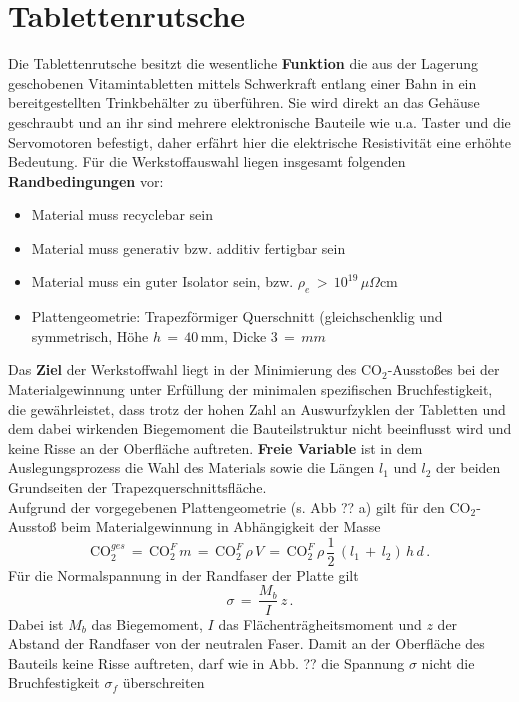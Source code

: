 \section{Tablettenrutsche}
Die Tablettenrutsche besitzt die wesentliche \textbf{Funktion} die aus der Lagerung geschobenen Vitamintabletten mittels Schwerkraft entlang einer Bahn in ein bereitgestellten Trinkbehälter zu überführen. Sie wird direkt an das Gehäuse geschraubt und an ihr sind mehrere elektronische Bauteile wie u.a. Taster und die Servomotoren befestigt, daher erfährt hier die elektrische Resistivität eine erhöhte Bedeutung. Für die Werkstoffauswahl liegen insgesamt folgenden \textbf{Randbedingungen} vor:
\begin{itemize}
	\item Material muss recyclebar sein
	\item Material muss generativ bzw. additiv fertigbar sein
	\item Material muss ein guter Isolator sein, bzw. $\rho_e\,>\,10^{19}\,\mu\Omega$cm
	\item Plattengeometrie: Trapezförmiger Querschnitt (gleichschenklig und symmetrisch, Höhe $h\,=\,40\,$mm, Dicke $3\,=\,mm$
\end{itemize}
Das \textbf{Ziel} der Werkstoffwahl liegt in der Minimierung des CO$_2$-Ausstoßes bei der Materialgewinnung unter Erfüllung der minimalen spezifischen Bruchfestigkeit, die gewährleistet, dass trotz der hohen Zahl an Auswurfzyklen der Tabletten und dem dabei wirkenden Biegemoment die Bauteilstruktur nicht beeinflusst wird und keine Risse an der Oberfläche auftreten. \textbf{Freie Variable} ist in dem Auslegungsprozess die Wahl des Materials sowie die Längen $l_1$ und $l_2$ der beiden Grundseiten der Trapezquerschnittsfläche.\\
Aufgrund der vorgegebenen Plattengeometrie (s. Abb ?? a) gilt für den CO$_2$-Ausstoß beim Materialgewinnung in Abhängigkeit der Masse
\begin{equation}\label{masse32}
\text{CO}_2^{ges}\,=\,\text{CO}_2^F\,m\,=\,\text{CO}_2^F\,\rho\,V\,=\,\text{CO}_2^F\,\rho\,\frac{1}{2}\,(l_1\,+\,l_2)\,h\,d\,.
\end{equation}
Für die Normalspannung in der Randfaser der Platte gilt
\begin{equation}
\sigma\,=\,\frac{M_b}{I}\,z\,.
\end{equation}
Dabei ist $M_b$ das Biegemoment, $I$ das Flächenträgheitsmoment und $z$ der Abstand der Randfaser von der neutralen Faser. Damit an der Oberfläche des Bauteils keine Risse auftreten, darf wie in Abb. ?? die Spannung $\sigma$ nicht die Bruchfestigkeit $\sigma_f$ überschreiten
